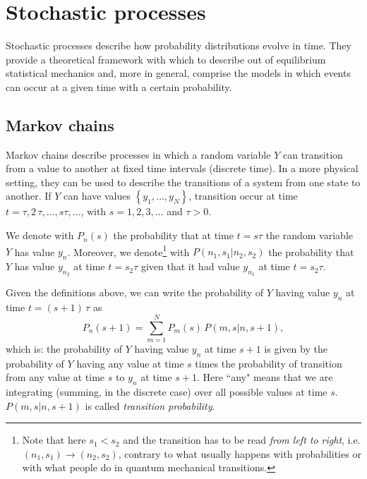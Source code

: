 \documentclass[12pt]{article}
\numberwithin{equation}{section} %
\begin{document}
\section{Stochastic processes}
Stochastic processes describe how probability distributions evolve in time. They provide a theoretical framework with which to describe out of equilibrium statistical mechanics and, more in general, comprise the models in which events can occur at a given time with a certain probability.

\subsection{Markov chains}
Markov chains describe processes in which a random variable $Y$ can transition from a value to another at fixed time intervals (discrete time). In a more physical setting, they can be used to describe the transitions of a system from one state to another. If $Y$ can have values $\left\lbrace y_1, \ldots, y_N \right\rbrace$, transition occur at time $t = \tau, 2\,\tau, \ldots, s\tau, \ldots$, with $s=1, 2, 3, \ldots$ and $\tau >0$.

We denote with $P_n(s)$ the probability that at time $t=s\tau$ the random variable $Y$ has value $y_n$. Moreover, we denote\footnote{Note that here $s_1<s_2$ and the transition has to be read \textit{from left to right}, i.e. $(n_1, s_1)\to (n_2, s_2)$, contrary to what usually happens with probabilities or with what people do in quantum mechanical transitions.} with $P\left(n_1, s_1|n_2, s_2\right)$ the probability that $Y$ has value $y_{n_2}$ at time $t=s_2 \tau$ given that it had value $y_{n_1}$ at time $t = s_2 \tau$.

Given the definitions above, we can write the probability of $Y$ having value $y_n$ at time $t = (s+1)\,\tau$ as
\begin{equation}
\label{absolute_prob_state}
P_n(s+1) = \sum_{m=1}^N P_m(s)\,P\left(m, s| n, s+1\right),
\end{equation}
which is: the probability of $Y$ having value $y_n$ at time $s+1$ is given by the probability of $Y$ having any value at time $s$ times the probability of transition from any value at time $s$ to $y_n$ at time $s+1$. Here ``any" means that we are integrating (summing, in the discrete case) over all possible values at time $s$. $P\left(m, s| n, s+1\right)$ is called \textit{transition probability}.
\end{document}
